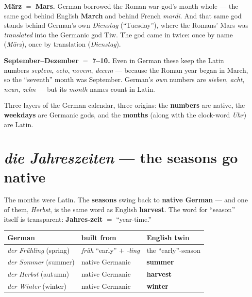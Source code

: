 \begin{etymology}
\textbf{M\"{a}rz} $=$ \textbf{Mars.} German borrowed the Roman war-god's month
whole --- the same god behind English \textbf{March} and behind French
\emph{mardi}. And that same god stands behind German's own \emph{Dienstag}
(``Tuesday''), where the Romans' Mars was \emph{translated} into the Germanic
god Tiw. The god came in twice: once by name (\emph{M\"{a}rz}), once by
translation (\emph{Dienstag}).
\end{etymology}

\begin{etymology}
\textbf{September--Dezember} $=$ \textbf{7--10.} Even in German these keep the
Latin numbers \emph{septem}, \emph{octo}, \emph{novem}, \emph{decem} --- because
the Roman year began in March, so the ``seventh'' month was September. German's
\emph{own} numbers are \emph{sieben}, \emph{acht}, \emph{neun}, \emph{zehn} ---
but its \emph{month} names count in Latin.
\end{etymology}

\begin{culture}
Three layers of the German calendar, three origins: the \textbf{numbers} are
native, the \textbf{weekdays} are Germanic gods, and the \textbf{months} (along
with the clock-word \emph{Uhr}) are Latin.
\end{culture}

\section{\emph{die Jahreszeiten} --- the seasons go native}
\label{lesson:jahreszeiten}

The months were Latin. The \textbf{seasons} swing back to \textbf{native
German} --- and one of them, \emph{Herbst}, is the same word as English
\textbf{harvest}. The word for ``season'' itself is transparent:
\textbf{Jahres-zeit} $=$ ``year-time.''

\begin{center}
\begin{tabular}{@{}lll@{}}
\toprule
German & built from & English twin \\
\midrule
\emph{der Fr\"{u}hling} (spring) & \emph{fr\"{u}h} ``early'' $+$ \emph{-ling} & the ``early''-season \\
\emph{der Sommer} (summer) & native Germanic & \textbf{summer} \\
\emph{der Herbst} (autumn) & native Germanic & \textbf{harvest} \\
\emph{der Winter} (winter) & native Germanic & \textbf{winter} \\
\bottomrule
\end{tabular}
\end{center}

